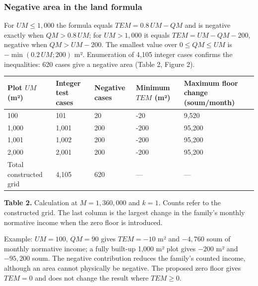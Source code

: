 \documentclass[14pt,a4paper]{extarticle}
\begin{document}
\subsubsection{Negative area in the land formula}\label{res:land}
For $UM\le1{,}000$ the formula equals $TEM=0.8\,UM-QM$ and is negative exactly when $QM>0.8\,UM$; for $UM>1{,}000$ it equals $TEM=UM-QM-200$, negative when $QM>UM-200$. The smallest value over $0\le QM\le UM$ is $-\min(0.2\,UM;200)$ m². Enumeration of 4,105 integer cases confirms the inequalities: 620 cases give a negative area (Table 2, Figure 2).

\begingroup\fontsize{11bp}{13.2bp}\selectfont
\begin{longtable}{p{} p{} p{} p{} p{}}
\toprule
Plot $UM$ (m²) & Integer test cases & Negative cases & Minimum $TEM$ (m²) & Maximum floor change (soum/month) \\
\midrule
\endhead
100 & 101 & 20 & -20 & 9,520 \\
1,000 & 1,001 & 200 & -200 & 95,200 \\
1,001 & 1,002 & 200 & -200 & 95,200 \\
2,000 & 2,001 & 200 & -200 & 95,200 \\
Total constructed grid & 4,105 & 620 & — & — \\
\bottomrule
\end{longtable}
\endgroup
\textbf{Table 2.} Calculation at $M=1{,}360{,}000$ and $k=1$. Counts refer to the constructed grid. The last column is the largest change in the family’s monthly normative income when the zero floor is introduced.

Example: $UM=100$, $QM=90$ gives $TEM=-10$ m² and $-4{,}760$ soum of monthly normative income; a fully built-up 1,000 m² plot gives $-200$ m² and $-95{,}200$ soum. The negative contribution reduces the family’s counted income, although an area cannot physically be negative. The proposed zero floor gives $TEM=0$ and does not change the result where $TEM\ge0$.
\end{document}
